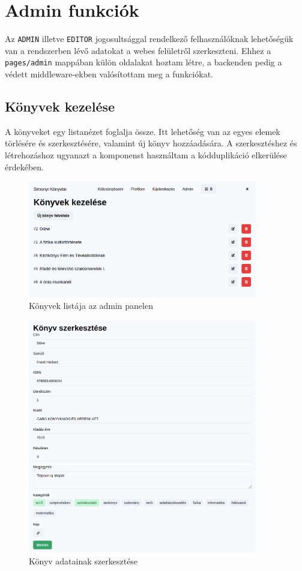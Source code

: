 \section{Admin funkciók}

Az \lstinline|ADMIN| illetve \lstinline|EDITOR| jogosultsággal rendelkező felhasználóknak lehetőségük van a rendszerben
lévő adatokat a webes felületről szerkeszteni. Ehhez a \lstinline|pages/admin| mappában külön oldalakat hoztam létre,
a backenden pedig a védett middleware-ekben valósítottam meg a funkciókat.

\subsection{Könyvek kezelése}

A könyveket egy listanézet foglalja össze. Itt lehetőség van az egyes elemek törlésére és szerkesztésére, valamint új
könyv hozzáadására. A szerkesztéshez és létrehozáshoz ugyanazt a komponenst használtam a kódduplikáció elkerülése érdekében.

\begin{figure}[!ht]
  \centering
  \includegraphics[width=100mm, keepaspectratio]{figures/book-admin-list.png}
  \caption{Könyvek listája az admin panelen}
  \label{fig:BookAdminList}
\end{figure}

\begin{figure}[!ht]
  \centering
  \includegraphics[width=100mm, keepaspectratio]{figures/book-edit.png}
  \caption{Könyv adatainak szerkesztése}
  \label{fig:BookEdit}
\end{figure}


